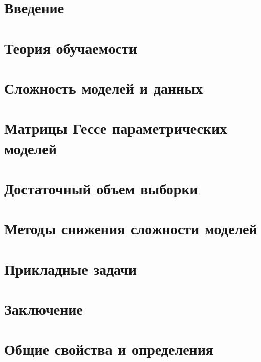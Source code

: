 \documentclass{dissert}
\begin{document}

\setcounter{page}{2}

\newpage
\tableofcontents

\newpage{}
\chapter*{Введение}


\clearpage
\chapter{Теория обучаемости}\label{chapter:curent-learnability-theory}


\clearpage
\chapter{Сложность моделей и данных}\label{chapter:complexity}


\clearpage
\chapter{Матрицы Гессе параметрических моделей}\label{chapter:gesian}


\clearpage
\chapter{Достаточный объем выборки}\label{chapter:samplesize}


\clearpage
\chapter{Методы снижения сложности моделей}\label{chapter:pruning}


\clearpage
\chapter{Прикладные задачи}\label{chapter:other-aplication}


\clearpage
\chapter*{Заключение}


\clearpage
\chapter*{Общие свойства и определения}

\end{document}
